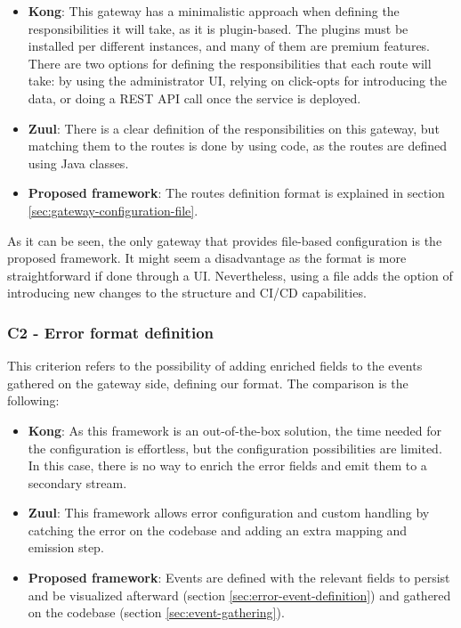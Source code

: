 \documentclass[english, 12pt, a4paper, sci, utf8, a-1b, online]{aaltothesis}
\begin{document}
\begin{itemize}
    \item \textbf{Kong}: This gateway has a minimalistic approach when defining the responsibilities it will take, as it is plugin-based. The plugins must be installed per different instances, and many of them are premium features. There are two options for defining the responsibilities that each route will take: by using the administrator UI, relying on click-opts for introducing the data, or doing a REST API call once the service is deployed.
    \item \textbf{Zuul}: There is a clear definition of the responsibilities on this gateway, but matching them to the routes is done by using code, as the routes are defined using Java classes.
    \item \textbf{Proposed framework}: The routes definition format is explained in section \ref{sec:gateway-configuration-file}.
\end{itemize}

As it can be seen, the only gateway that provides file-based configuration is the proposed framework. It might seem a disadvantage as the format is more straightforward if done through a UI. Nevertheless, using a file adds the option of introducing new changes to the structure and CI/CD capabilities.

\subsubsection*{C2 - Error format definition}
This criterion refers to the possibility of adding enriched fields to the events gathered on the gateway side, defining our format. The comparison is the following:

\begin{itemize}
    \item \textbf{Kong}: As this framework is an out-of-the-box solution, the time needed for the configuration is effortless, but the configuration possibilities are limited. In this case, there is no way to enrich the error fields and emit them to a secondary stream.
    \item \textbf{Zuul}: This framework allows error configuration and custom handling by catching the error on the codebase and adding an extra mapping and emission step.
    \item \textbf{Proposed framework}: Events are defined with the relevant fields to persist and be visualized afterward (section \ref{sec:error-event-definition}) and gathered on the codebase (section \ref{sec:event-gathering}).
\end{itemize}
\end{document}

